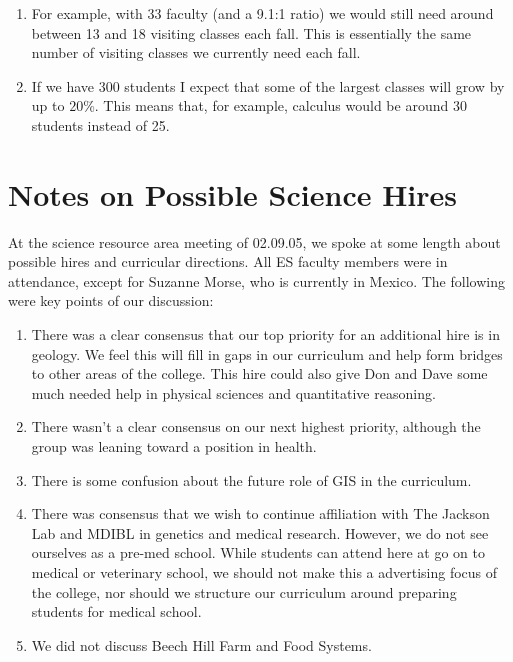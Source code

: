 \documentclass[12pt]{article}
\begin{document}
\begin{enumerate}
    \item For example, with 33 faculty (and a 9.1:1 ratio) we would
    still need around between 13 and 18 visiting classes each fall.
    This is essentially the same number of visiting classes we
    currently need each fall.  

  
    \item If we have 300 students I expect that some of the largest
    classes will grow by up to $20$\%. This means that, for example,
    calculus would be around 30 students instead of 25.  


\end{enumerate}

\section{Notes on Possible Science Hires}

At the science resource area meeting of 02.09.05, we spoke at some
length about possible hires and curricular directions.  All ES faculty
members were in attendance, except for Suzanne Morse, who is currently
in Mexico.  The following were key points of our discussion:
\begin{enumerate}

\item There was a clear consensus that our top priority for an
additional hire is in geology.  We feel this will fill in gaps in our
curriculum and help form bridges to other areas of the college.  This
hire could also give Don and Dave some much needed help in physical
sciences and quantitative reasoning.

\item There wasn't a clear consensus on our next highest priority,
although the group was leaning toward a position in health.

\item There is some confusion about the future role of GIS in the
curriculum.

\item There was consensus that we wish to continue affiliation
with The Jackson Lab and MDIBL in genetics and medical research.
However, we do not see ourselves as a pre-med school.  While students
can attend here at go on to medical or veterinary school, we should
not make this a advertising focus of the college, nor should we
structure our curriculum around preparing students for medical school.  

\item We did not discuss Beech Hill Farm and Food Systems.

\end{enumerate}
\end{document}
